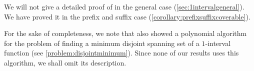 We will not give a detailed proof of
in the general case (\cref{sec:1intervalgeneral}).
We have proved it in the prefix and suffix case
(\cref{corollary:prefixsuffixcoverable}).

For the sake of completeness,
we note that
\citeauthor{Schieber2005154} also showed a polynomial
algorithm for the problem of finding
a minimum disjoint spanning set
of a $1$-interval function
\citep[Section 4]{Schieber2005154}
(see \cref{problem:disjointminimum}).
Since none of our results uses this algorithm,
we shall omit its description.

